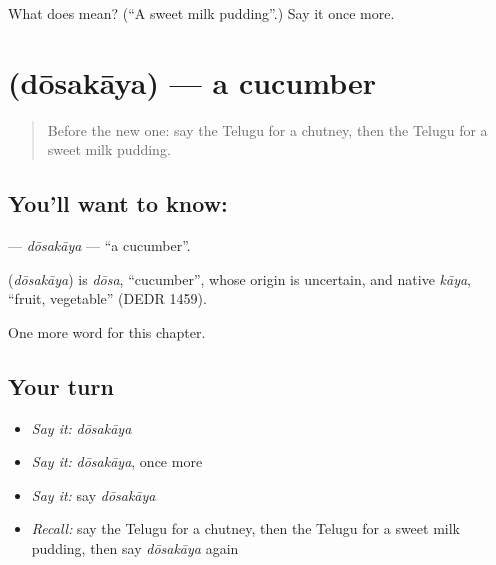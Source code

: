 \begin{tcolorbox}[breakable,colback=teal!4,colframe=teal!35!black,title={Before you move on}]
What does  mean? (\textquotedblleft{}A sweet milk pudding\textquotedblright{}.) Say it once more.
\end{tcolorbox}
\section[\texorpdfstring{\te{దోసకాయ} (dōsakāya)}{దోసకాయ (dōsakāya)}]{ (dōsakāya) — a cucumber}

\label{lesson:TE-C184-dosakaya}



\begin{quote}
Before the new one: say the Telugu for a chutney, then the Telugu for a sweet milk pudding.
\end{quote}

\subsection*{You'll want to know: }
\textbf{} — \emph{dōsakāya} — \textquotedblleft{}a cucumber\textquotedblright{}.

\begin{cousinweb}
\textbf{} (\emph{dōsakāya}) is \emph{dōsa}, \textquotedblleft{}cucumber\textquotedblright{}, whose origin is uncertain, and native \emph{kāya}, \textquotedblleft{}fruit, vegetable\textquotedblright{} (DEDR 1459).
\end{cousinweb}

\begin{grammarlens}[title={What you've built}]
One more word for this chapter.
\end{grammarlens}

\subsection*{Your turn}
\begin{itemize}
\raggedright
  \item \emph{Say it:} \emph{dōsakāya}
  \item \emph{Say it:} \emph{dōsakāya}, once more
  \item \emph{Say it:} say \emph{dōsakāya}
  \item \emph{Recall:} say the Telugu for a chutney, then the Telugu for a sweet milk pudding, then say \emph{dōsakāya} again
\end{itemize}

